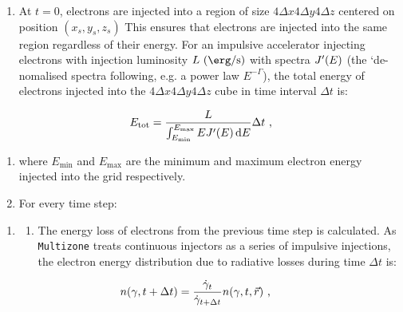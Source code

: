 \begin{enumerate}[label=\textbf{\arabic*}.]\setcounter{enumi}{\value{counter1}}
\item At $t=0$, electrons are injected into a region of size $4\Delta x4\Delta y4\Delta z$ centered on position $(x_s,y_s,z_s)$ This ensures that electrons are injected into the same region regardless of their energy. For an impulsive accelerator injecting electrons with injection luminosity $L~\qty(\ergspersecond)$ with spectra $J'\qty(E)$ (the `de-nomalised spectra following, e.g. a power law $E^{-\Gamma}$), the total energy of electrons injected into the $4\Delta x4\Delta y4\Delta z$ cube in time interval $\Delta t$ is:
\setcounter{counter1}{\value{enumi}}
\end{enumerate}

\begin{equation}
    \begin{aligned}
        E_\text{tot}= \frac{L}{\int_{E_\text{min}}^{E_\text{max}}EJ'\qty(E)\dd{E}} \Delta t\text{ ,} 
    \end{aligned} \label{eq:09_multizone_total_energy_in_cells}
\end{equation}

\begin{enumerate}[label=\textbf{\arabic*}.]\setcounter{enumi}{\value{counter1}}
\item[] where $E_\text{min}$ and $E_\text{max}$ are the minimum and maximum electron energy injected into the grid respectively.
\item For every time step:
\setcounter{counter1}{\value{enumi}}
\end{enumerate}
\begin{enumerate}[label=\textbf{\arabic*}]\setcounter{enumi}{\value{counter1}}
	\item[]
\begin{enumerate}[label*=\textbf{\alph*}.]
    \itemsep0em
    \item The energy loss of electrons from the previous time step is calculated. As {\tt Multizone} treats continuous injectors as a series of impulsive injections, the electron energy distribution due to radiative losses during time $\Delta t$ is: \label{item:09_step_5a}
    \setcounter{counter2}{\value{enumii}}
\end{enumerate}
\end{enumerate}

\begin{equation}
    \begin{aligned}
    n\qty(\gamma,t+\Delta t) &=\frac{\dot{\gamma}_t}{\dot{\gamma}_{t+\Delta t}}n\qty(\gamma,t,\vec{r})\text{ ,} 
    \end{aligned}
\end{equation}


